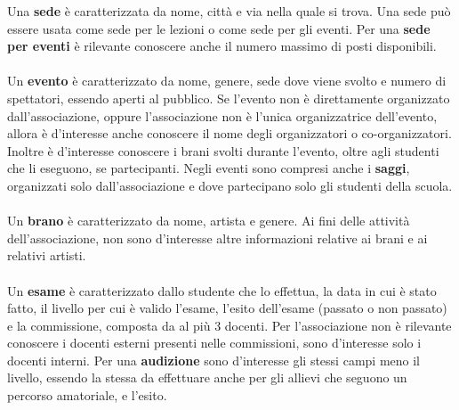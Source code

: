 \documentclass[11pt]{article}
\begin{document}
	Una \textbf{sede} è caratterizzata da nome, città e via nella quale si trova. Una sede può essere usata come sede per le lezioni o come sede per gli eventi. Per una \textbf{sede per eventi} è rilevante conoscere anche il numero massimo di posti disponibili.\\\\
	Un \textbf{evento} è caratterizzato da nome, genere, sede dove viene svolto e numero di spettatori, essendo aperti al pubblico. Se l'evento non è direttamente organizzato dall'associazione, oppure l'associazione non è l'unica organizzatrice dell'evento, allora è d'interesse anche conoscere il nome degli organizzatori o co-organizzatori. Inoltre è d'interesse conoscere i brani svolti durante l'evento, oltre agli studenti che li eseguono, se partecipanti. Negli eventi sono compresi anche i \textbf{saggi}, organizzati solo dall'associazione e dove partecipano solo gli studenti della scuola.\\\\
	Un \textbf{brano} è caratterizzato da nome, artista e genere. Ai fini delle attività dell'associazione, non sono d'interesse altre informazioni relative ai brani e ai relativi artisti.\\\\
	Un \textbf{esame} è caratterizzato dallo studente che lo effettua, la data in cui è stato fatto, il livello per cui è valido l'esame, l'esito dell'esame (passato o non passato) e la commissione, composta da al più 3 docenti. Per l'associazione non è rilevante conoscere i docenti esterni presenti nelle commissioni, sono d'interesse solo i docenti interni. Per una \textbf{audizione} sono d'interesse gli stessi campi meno il livello, essendo la stessa da effettuare anche per gli allievi che seguono un percorso amatoriale, e l'esito.
\end{document}
